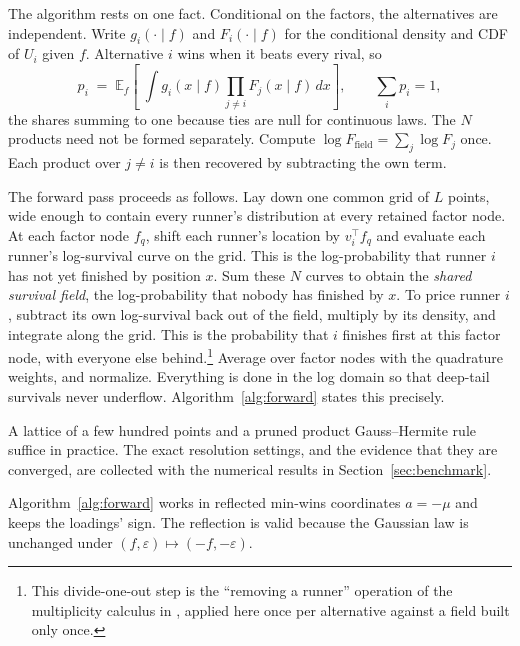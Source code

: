 \documentclass[12pt]{article}
\theoremstyle{remark}
\newcommand{\E}{\mathbb{E}}
\begin{document}
The algorithm rests on one fact. Conditional on the factors, the
alternatives are independent. Write $g_i(\cdot \mid f)$ and
$F_i(\cdot \mid f)$ for the conditional density and CDF of $U_i$ given
$f$. Alternative $i$ wins when it beats every rival, so
\begin{equation}
p_i \;=\; \E_f\!\left[\;\int g_i(x \mid f)
\prod_{j \neq i} F_j(x \mid f)\, dx \right],
\qquad \sum_i p_i = 1,
\label{eq:forward}
\end{equation}
the shares summing to one because ties are null for continuous laws.
The $N$ products need not be formed
separately. Compute $\log F_{\mathrm{field}} = \sum_j \log F_j$ once.
Each product over $j \ne i$ is then recovered by subtracting the own
term.

The forward pass proceeds as follows. Lay down one common
grid of $L$ points, wide enough to contain every runner's distribution
at every retained factor node. At each factor node $f_q$, shift each
runner's location by $v_i^\top f_q$ and evaluate each runner's
log-survival curve on the grid. This is the log-probability that runner
$i$ has not yet finished by position $x$. Sum these $N$ curves to obtain the
\emph{shared survival field}, the log-probability that nobody has
finished by $x$. To price runner $i$, subtract its own log-survival
back out of the field, multiply by its density, and integrate along the
grid. This is the probability that $i$ finishes first at this factor
node, with everyone else behind.\footnote{This divide-one-out step is
the ``removing a runner'' operation of the multiplicity calculus in
\citet{cotton2021}, applied here once per alternative against a field
built only once.} Average over factor nodes with the
quadrature weights, and normalize. Everything is done in the log domain
so that deep-tail survivals never underflow. Algorithm~\ref{alg:forward}
states this precisely.

A lattice of a few hundred points and a pruned product Gauss--Hermite
rule suffice in practice. The exact resolution settings, and the
evidence that they are converged, are collected with the numerical
results in Section~\ref{sec:benchmark}.

Algorithm~\ref{alg:forward} works in reflected min-wins coordinates
$a = -\mu$ and keeps the loadings' sign. The reflection is valid
because the Gaussian law is unchanged under $(f, \varepsilon) \mapsto
(-f, -\varepsilon)$.
\end{document}
